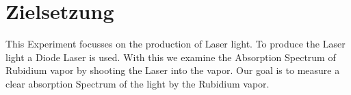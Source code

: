 \section{Zielsetzung}
\label{sec:Zielsetzung}

This Experiment focusses on the production of Laser light.
To produce the Laser light a Diode Laser is used.
With this we examine the Absorption Spectrum of Rubidium vapor by shooting the Laser into the vapor.
Our goal is to measure a clear absorption Spectrum of the light by the Rubidium vapor.